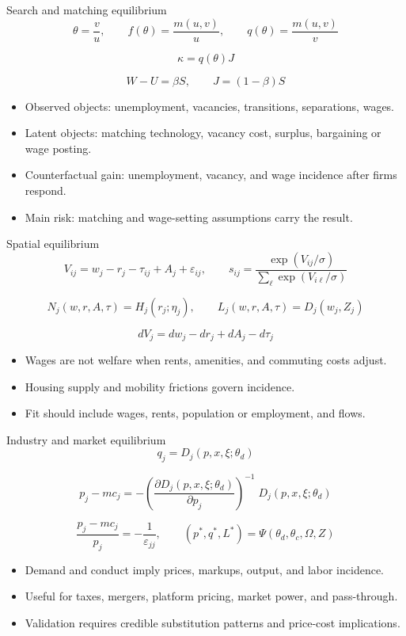 \documentclass[aspectratio=169,11pt]{beamer}
\newcommand{\1}{\mathbf{1}}
\begin{document}
\begin{frame}{Search and matching equilibrium}
\small
\[
\theta = \frac{v}{u},
\qquad
f(\theta)=\frac{m(u,v)}{u},
\qquad
q(\theta)=\frac{m(u,v)}{v}
\]

\[
\kappa = q(\theta)J
\]

\[
W-U=\beta S,
\qquad
J=(1-\beta)S
\]

\begin{itemize}
    \item Observed objects: unemployment, vacancies, transitions, separations, wages.
    \item Latent objects: matching technology, vacancy cost, surplus, bargaining or wage posting.
    \item Counterfactual gain: unemployment, vacancy, and wage incidence after firms respond.
    \item Main risk: matching and wage-setting assumptions carry the result.
\end{itemize}
\end{frame}

\begin{frame}{Spatial equilibrium}
\small
\[
V_{ij}
=
w_j-r_j-\tau_{ij}+A_j+\varepsilon_{ij},
\qquad
s_{ij}
=
\frac{\exp(V_{ij}/\sigma)}
{\sum_{\ell}\exp(V_{i\ell}/\sigma)}
\]

\[
N_j(w,r,A,\tau)=H_j(r_j;\eta_j),
\qquad
L_j(w,r,A,\tau)=D_j(w_j,Z_j)
\]

\[
dV_j = dw_j - dr_j + dA_j - d\tau_j
\]

\begin{itemize}
    \item Wages are not welfare when rents, amenities, and commuting costs adjust.
    \item Housing supply and mobility frictions govern incidence.
    \item Fit should include wages, rents, population or employment, and flows.
\end{itemize}
\end{frame}

\begin{frame}{Industry and market equilibrium}
\small
\[
q_j = D_j(p,x,\xi;\theta_d)
\]

\[
p_j - mc_j
=
-\left(
\frac{\partial D_j(p,x,\xi;\theta_d)}{\partial p_j}
\right)^{-1}
\;D_j(p,x,\xi;\theta_d)
\]

\[
\frac{p_j-mc_j}{p_j}=-\frac{1}{\varepsilon_{jj}},
\qquad
(p^\ast,q^\ast,L^\ast)=\Psi(\theta_d,\theta_c,\Omega,Z)
\]

\begin{itemize}
    \item Demand and conduct imply prices, markups, output, and labor incidence.
    \item Useful for taxes, mergers, platform pricing, market power, and pass-through.
    \item Validation requires credible substitution patterns and price-cost implications.
\end{itemize}
\end{frame}
\end{document}
